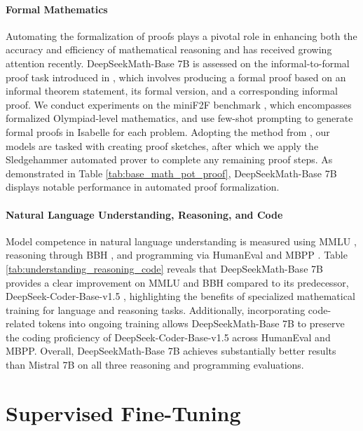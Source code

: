 \paragraph{Formal Mathematics}

Automating the formalization of proofs plays a pivotal role in enhancing both the accuracy and efficiency of mathematical reasoning and has received growing attention recently. DeepSeekMath-Base 7B is assessed on the informal-to-formal proof task introduced in \citep{dsp_proof}, which involves producing a formal proof based on an informal theorem statement, its formal version, and a corresponding informal proof. We conduct experiments on the miniF2F benchmark \citep{minif2f}, which encompasses formalized Olympiad-level mathematics, and use few-shot prompting to generate formal proofs in Isabelle for each problem. Adopting the method from \cite{dsp_proof}, our models are tasked with creating proof sketches, after which we apply the Sledgehammer automated prover \citep{sledgehammer} to complete any remaining proof steps. As demonstrated in Table \ref{tab:base_math_pot_proof}, DeepSeekMath-Base 7B displays notable performance in automated proof formalization.

\paragraph{Natural Language Understanding, Reasoning, and Code}

Model competence in natural language understanding is measured using MMLU \citep{mmlu}, reasoning through BBH \citep{bbh}, and programming via HumanEval \citep{codex} and MBPP \citep{mbpp}. Table \ref{tab:understanding_reasoning_code} reveals that DeepSeekMath-Base 7B provides a clear improvement on MMLU and BBH compared to its predecessor, DeepSeek-Coder-Base-v1.5 \citep{deepseek-coder}, highlighting the benefits of specialized mathematical training for language and reasoning tasks. Additionally, incorporating code-related tokens into ongoing training allows DeepSeekMath-Base 7B to preserve the coding proficiency of DeepSeek-Coder-Base-v1.5 across HumanEval and MBPP. Overall, DeepSeekMath-Base 7B achieves substantially better results than Mistral 7B \citep{mistral} on all three reasoning and programming evaluations.

\section{Supervised Fine-Tuning}

